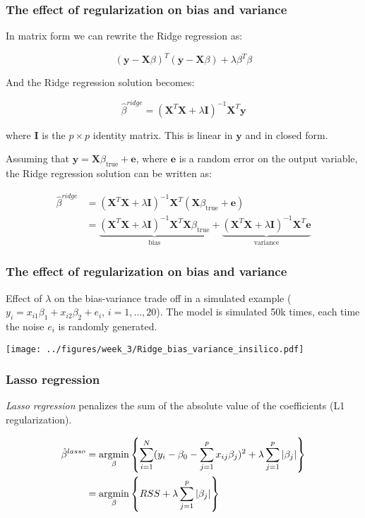 \documentclass[notes]{beamer}          %
\newcommand{\argmin}{\operatornamewithlimits{argmin}}
\begin{document}
\begin{frame}
\frametitle{The effect of regularization on bias and variance}
In matrix form we can rewrite the Ridge regression as:

\begin{equation*}
    (\mathbf{y} - \mathbf{X}\beta)^T (\mathbf{y} - \mathbf{X}\beta) + \lambda\beta^T\beta
\end{equation*}

And the Ridge regression solution becomes:

\begin{equation*}
    \hat{\beta}^{ridge} = (\mathbf{X}^T \mathbf{X} + \lambda \mathbf{I})^{-1}\mathbf{X}^T\mathbf{y} 
\end{equation*}

where $\mathbf{I}$ is the $p \times p$ identity matrix. This is linear in $\mathbf{y}$ and in closed form.

Assuming that $\mathbf{y} = \mathbf{X}\beta_{\mathrm{true}} + \mathbf{e}$, where $\mathbf{e}$ is a random error on the output variable, the Ridge regression solution can be written as:

\begin{align*}
    \hat{\beta}^{ridge} &= (\mathbf{X}^T \mathbf{X} + \lambda \mathbf{I})^{-1}\mathbf{X}^T(\mathbf{X}\beta_{\mathrm{true}} + \mathbf{e}) \\
    &= \underbrace{(\mathbf{X}^T \mathbf{X} + \lambda \mathbf{I})^{-1}\mathbf{X}^T\mathbf{X}\beta_{\mathrm{true}}}_{\textrm{bias}} + \underbrace{(\mathbf{X}^T \mathbf{X} + \lambda \mathbf{I})^{-1}\mathbf{X}^T\mathbf{e}}_{\textrm{variance}}
\end{align*}

\end{frame}


\begin{frame}
\frametitle{The effect of regularization on bias and variance}
Effect of $\lambda$ on the bias-variance trade off in a simulated example ($y_i = x_{i1}\beta_1 + x_{i2}\beta_2 + e_i$, $i=1,\dots, 20$). The model is simulated 50k times, each time the noise $e_i$ is randomly generated.




\begin{center}
\texttt{[image: ../figures/week\_3/Ridge\_bias\_variance\_insilico.pdf]}
\end{center}

\end{frame}


\begin{frame}
\frametitle{Lasso regression}
\textit{Lasso regression} penalizes the sum of the absolute value of the coefficients (L1 regularization). 

\begin{align*}
\hat{\beta}^{lasso} &= \argmin_{\beta} \left\{ \sum_{i=1}^N (y_i - \beta_0 -  \sum_{j=1}^p x_{ij}\beta_j)^2 + \lambda \sum_{j=1}^p | \beta_j | \right\} \\
& =  \argmin_{\beta} \left\{ RSS + \lambda \sum_{j=1}^p | \beta_j | \right\}
\end{align*}

\end{frame}
\end{document}
